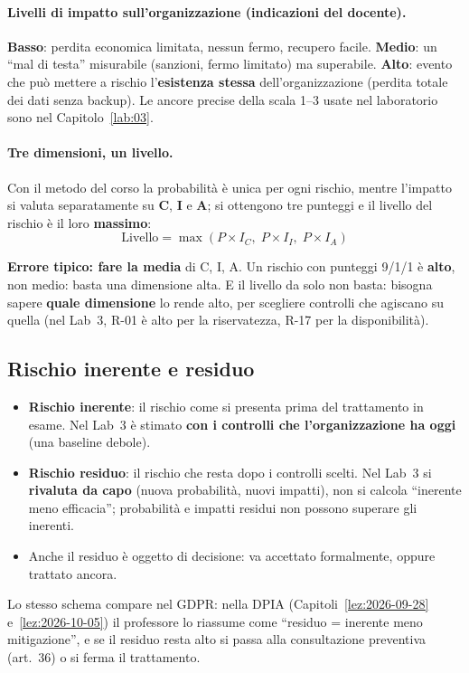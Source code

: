 \paragraph{Livelli di impatto sull'organizzazione (indicazioni del docente).} \textbf{Basso}: perdita
economica limitata, nessun fermo, recupero facile. \textbf{Medio}: un ``mal di testa'' misurabile (sanzioni,
fermo limitato) ma superabile. \textbf{Alto}: evento che può mettere a rischio l'\textbf{esistenza stessa}
dell'organizzazione (perdita totale dei dati senza backup). Le ancore precise della scala 1--3 usate nel
laboratorio sono nel Capitolo~\ref{lab:03}.

\paragraph{Tre dimensioni, un livello.} Con il metodo del corso la probabilità è unica per ogni rischio,
mentre l'impatto si valuta separatamente su \textbf{C}, \textbf{I} e \textbf{A}; si ottengono tre punteggi e
il livello del rischio è il loro \textbf{massimo}:
\[
\text{Livello} = \max\left(P \times I_C,\; P \times I_I,\; P \times I_A\right)
\]

\begin{esame}
\textbf{Errore tipico: fare la media} di C, I, A. Un rischio con punteggi 9/1/1 è \textbf{alto}, non medio:
basta una dimensione alta. E il livello da solo non basta: bisogna sapere \textbf{quale dimensione} lo rende
alto, per scegliere controlli che agiscano su quella (nel Lab~3, R-01 è alto per la riservatezza, R-17 per
la disponibilità).
\end{esame}

\subsection{Rischio inerente e residuo}
\begin{itemize}
  \item \textbf{Rischio inerente}: il rischio come si presenta prima del trattamento in esame. Nel Lab~3 è
    stimato \textbf{con i controlli che l'organizzazione ha oggi} (una baseline debole).
  \item \textbf{Rischio residuo}: il rischio che resta dopo i controlli scelti. Nel Lab~3 si
    \textbf{rivaluta da capo} (nuova probabilità, nuovi impatti), non si calcola ``inerente meno
    efficacia''; probabilità e impatti residui non possono superare gli inerenti.
  \item Anche il residuo è oggetto di decisione: va accettato formalmente, oppure trattato ancora.
\end{itemize}
Lo stesso schema compare nel GDPR: nella DPIA (Capitoli~\ref{lez:2026-09-28} e~\ref{lez:2026-10-05}) il
professore lo riassume come ``residuo = inerente meno mitigazione'', e se il residuo resta alto si passa alla
consultazione preventiva (art.~36) o si ferma il trattamento.

